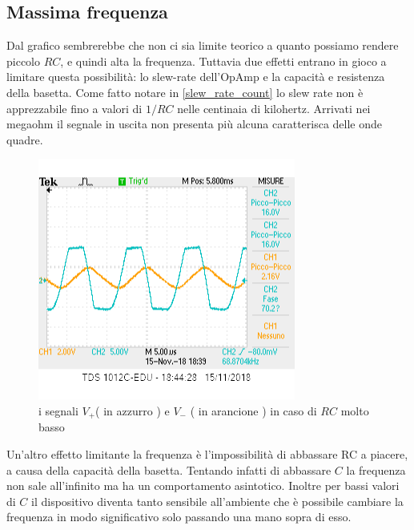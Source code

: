 \documentclass[10pt,a4paper]{article}
\begin{document}
\subsection{Massima frequenza}
Dal grafico sembrerebbe che non ci sia limite teorico a quanto possiamo rendere piccolo $RC$, e quindi alta la frequenza. Tuttavia due effetti entrano in gioco a limitare questa possibilità: lo slew-rate dell'OpAmp e la capacità e resistenza della basetta. Come fatto notare in \ref{slew_rate_count} lo slew rate non è apprezzabile fino a valori di $1/RC$ nelle centinaia di kilohertz. Arrivati nei megaohm il segnale in uscita non presenta più alcuna caratterisca delle onde quadre.

 \begin{figure}[h]
	\centering
	\includegraphics[scale=0.8]{freqRbassa.png}
	\caption{\small i segnali $V_+$( in azzurro ) e $V_-$ ( in arancione )  in caso di $RC$ molto basso}
	\label{fig:slew_rate}
\end{figure}

Un'altro effetto limitante la frequenza è l'impossibilità di abbassare RC a piacere, a causa della capacità della basetta. Tentando infatti di abbassare $C$ la frequenza non sale all'infinito ma ha un comportamento asintotico. Inoltre per bassi valori di $C$ il dispositivo diventa tanto sensibile all'ambiente che è possibile cambiare la frequenza in modo significativo solo passando una mano sopra di esso.
\end{document}
